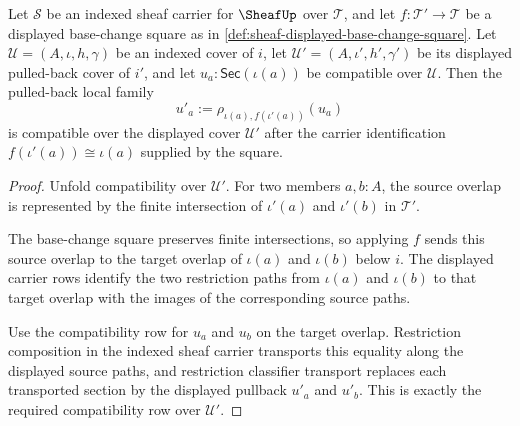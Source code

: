 \begin{theorem}
\label{thm:sheaf-base-change-cover-pullback-compatibility}
Let $\mathcal{S}$ be an indexed sheaf carrier for $\SheafUp$ over $\mathcal{T}$, and let $f:\mathcal{T}'\to\mathcal{T}$ be a displayed base-change square as in \autoref{def:sheaf-displayed-base-change-square}. Let $\mathcal{U}=(A,\iota,h,\gamma)$ be an indexed cover of $i$, let $\mathcal{U}'=(A,\iota',h',\gamma')$ be its displayed pulled-back cover of $i'$, and let $u_a:\mathsf{Sec}(\iota(a))$ be compatible over $\mathcal{U}$. Then the pulled-back local family
$$
u'_a:=\rho_{\iota(a),f(\iota'(a))}(u_a)
$$
is compatible over the displayed cover $\mathcal{U}'$ after the carrier identification $f(\iota'(a))\cong\iota(a)$ supplied by the square.
\end{theorem}
\begin{proof}
Unfold compatibility over $\mathcal{U}'$. For two members $a,b:A$, the source overlap is represented by the finite intersection of $\iota'(a)$ and $\iota'(b)$ in $\mathcal{T}'$.

The base-change square preserves finite intersections, so applying $f$ sends this source overlap to the target overlap of $\iota(a)$ and $\iota(b)$ below $i$. The displayed carrier rows identify the two restriction paths from $\iota(a)$ and $\iota(b)$ to that target overlap with the images of the corresponding source paths.

Use the compatibility row for $u_a$ and $u_b$ on the target overlap. Restriction composition in the indexed sheaf carrier transports this equality along the displayed source paths, and restriction classifier transport replaces each transported section by the displayed pullback $u'_a$ and $u'_b$. This is exactly the required compatibility row over $\mathcal{U}'$.
\end{proof}

